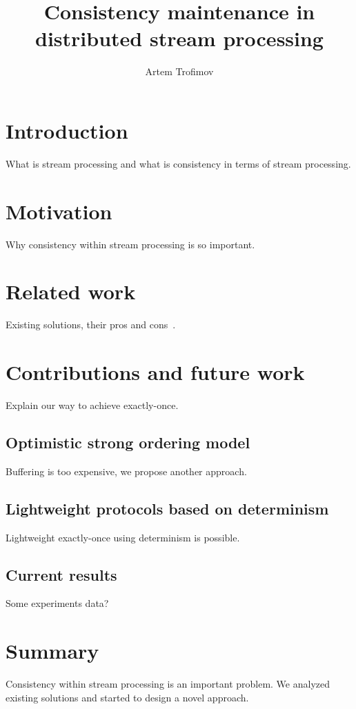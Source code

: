 \documentclass{llncs}
\begin{document}
\title {Consistency maintenance in distributed stream processing}
\author{Artem Trofimov}

\maketitle

\begin{abstract}

\end {abstract}

\section {Introduction}
What is stream processing and what is consistency in terms of stream processing.

\section {Motivation}
Why consistency within stream processing is so important.

\section {Related work}
Existing solutions, their pros and cons~\cite{Carbone:2017:SMA:3137765.3137777, Zaharia:2012:DSE:2342763.2342773}. 

\section {Contributions and future work}
Explain our way to achieve exactly-once.

\subsection{Optimistic strong ordering model}
Buffering is too expensive, we propose another approach.

\subsection{Lightweight protocols based on determinism}
Lightweight exactly-once using determinism is possible. 

\subsection{Current results}
Some experiments data?

\section {Summary}
Consistency within stream processing is an important problem. We analyzed existing solutions and started to design a novel approach.



\end{document}
